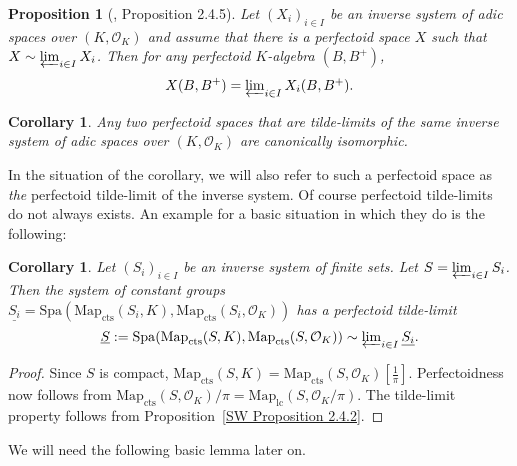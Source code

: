 \documentclass[10pt,oneside]{amsart}
\newtheorem{proposition}[theorem]{Proposition}
\newtheorem{corollary}[theorem]{Corollary}
\theoremstyle{definition}
\renewcommand{\O}{\mathcal{O}}
\begin{document}
\begin{proposition}[\cite{SW}, Proposition 2.4.5]\label{SW Proposition 2.4.5}
	Let $(X_i)_{i\in I}$ be an inverse system of adic spaces over $(K,\mathcal O_K)$ and assume that there is a perfectoid space $X$ such that $X\sim \varprojlim_{i\in I} X_i$. Then for any perfectoid $K$-algebra $(B,B^{+})$, 
	\[X(B,B^{+})  = \textstyle\varprojlim_{i\in I}X_i(B,B^{+}).\]
\end{proposition}
\begin{corollary}\label{corollary: perfectoid tilde limit is unique}
	Any two perfectoid spaces that are tilde-limits of the same inverse system of adic spaces over $(K,\mathcal O_K)$ are canonically isomorphic.
\end{corollary}
In the situation of the corollary, we will also refer to such a perfectoid space as \textit{the} perfectoid tilde-limit of the inverse system. Of course perfectoid tilde-limits do not always exists. An example for a basic situation in which they do is the following:
\begin{corollary}\label{pro-finite-perfectoid-spaces}
	Let $(S_i)_{i\in I}$ be an inverse system of finite sets. Let $S=\varprojlim_{i\in I} S_i$. Then the system of constant groups $\underline{S_i}=\mathrm{Spa}(\mathrm{Map}_{\mathrm{cts}}(S_i,K),\mathrm{Map}_{\mathrm{cts}}(S_i,\O_K))$ has a perfectoid tilde-limit	\[\underline{S}:=\mathrm{Spa}(\mathrm{Map}_{\mathrm{cts}}(S,K),\mathrm{Map}_{\mathrm{cts}}(S,\O_K))\sim\textstyle\varprojlim_{i\in I} \underline{S_i}.\]
\end{corollary}
\begin{proof}
	Since $S$ is compact, $\mathrm{Map}_{\mathrm{cts}}(S,K)=\mathrm{Map}_{\mathrm{cts}}(S,\O_K)[\tfrac{1}{\pi}]$. Perfectoidness now follows from $\mathrm{Map}_{\mathrm{cts}}(S,\O_K)/\pi=\mathrm{Map}_{\mathrm{lc}}(S,\O_K/\pi)$. The tilde-limit property follows from Proposition~\ref{SW Proposition 2.4.2}.
\end{proof}
We will need the following basic lemma later on.
\end{document}
